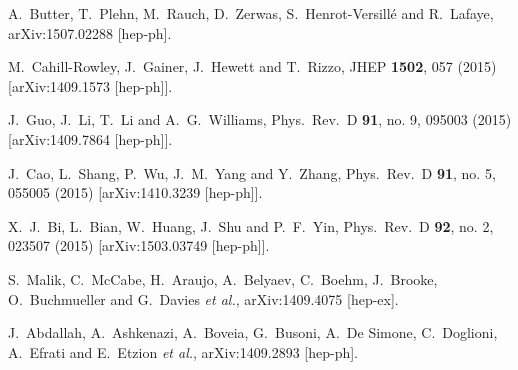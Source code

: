 \documentclass[preprintnumbers,superscriptaddress,nofootinbib,aps,prd,floatfix]{revtex4}
\begin{document}
\begin{thebibliography}{99}
  A.~Butter, T.~Plehn, M.~Rauch, D.~Zerwas, S.~Henrot-Versillé and R.~Lafaye,
  arXiv:1507.02288 [hep-ph].

  M.~Cahill-Rowley, J.~Gainer, J.~Hewett and T.~Rizzo,
  JHEP {\bf 1502}, 057 (2015)
  [arXiv:1409.1573 [hep-ph]].

  J.~Guo, J.~Li, T.~Li and A.~G.~Williams,
  Phys.\ Rev.\ D {\bf 91}, no. 9, 095003 (2015)
  [arXiv:1409.7864 [hep-ph]].

  J.~Cao, L.~Shang, P.~Wu, J.~M.~Yang and Y.~Zhang,
  Phys.\ Rev.\ D {\bf 91}, no. 5, 055005 (2015)
  [arXiv:1410.3239 [hep-ph]].

  X.~J.~Bi, L.~Bian, W.~Huang, J.~Shu and P.~F.~Yin,
  Phys.\ Rev.\ D {\bf 92}, no. 2, 023507 (2015)
  [arXiv:1503.03749 [hep-ph]].

  S.~Malik, C.~McCabe, H.~Araujo, A.~Belyaev, C.~Boehm, J.~Brooke, O.~Buchmueller and G.~Davies {\it et al.},
  arXiv:1409.4075 [hep-ex].

  J.~Abdallah, A.~Ashkenazi, A.~Boveia, G.~Busoni, A.~De Simone, C.~Doglioni, A.~Efrati and E.~Etzion {\it et al.},
  arXiv:1409.2893 [hep-ph].


\end{thebibliography}
\end{document}
